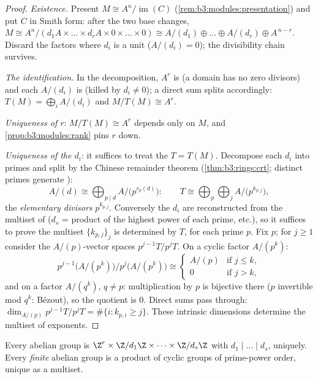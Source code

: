 \begin{proof}
\emph{Existence.} Present $M \cong A^n/\operatorname{im}(C)$
(\cref{rem:b3:modules:presentation}) and put $C$ in Smith form:
after the two base changes, $M \cong A^n / (d_1A \times \dots
\times d_rA \times 0 \times \dots \times 0) \cong A/(d_1) \oplus
\dots \oplus A/(d_r) \oplus A^{\,n - r}$. Discard the factors
where $d_i$ is a unit ($A/(d_i) = 0$); the divisibility chain
survives.

\emph{The  identification.} In the decomposition, $A^r$ is
 (a domain has no zero divisors) and each $A/(d_i)$
is  (killed by $d_i \ne 0$); a direct sum splits 
accordingly: $T(M) = \bigoplus_i A/(d_i)$ and $M/T(M) \cong A^r$.

\emph{Uniqueness of $r$}: $M/T(M) \cong A^r$ depends only on $M$,
and \cref{prop:b3:modules:rank} pins $r$ down.

\emph{Uniqueness of the $d_i$}: it suffices to treat the  $T = T(M)$. Decompose each $d_i$ into primes and split by
the Chinese remainder theorem (\cref{thm:b3:rings:crt}; distinct
primes generate ):
\[
A/(d) \cong \bigoplus_{p \mid d} A/\bigl(p^{v_p(d)}\bigr):
\qquad
T \cong \bigoplus_{p} \bigoplus_{j} A/\bigl(p^{k_{p,j}}\bigr),
\]
the \emph{elementary divisors}
$p^{k_{p,j}}$. Conversely the $d_i$ are reconstructed from the
multiset of  ($d_s$ = product of the highest
power of each prime, etc.), so it suffices to prove the
multiset $\{k_{p,j}\}_j$ is determined by $T$, for each prime
$p$. Fix $p$; for $j \geq 1$ consider the $A/(p)$-vector spaces
$p^{j-1}T/p^jT$. On a cyclic factor $A/(p^k)$:
\[
p^{j-1}\bigl(A/(p^k)\bigr)\big/p^{j}\bigl(A/(p^k)\bigr)
\cong
\begin{cases}
A/(p) & \text{if } j \leq k,\\
0 & \text{if } j > k,
\end{cases}
\]
and on a factor $A/(q^k)$, $q \neq p$: multiplication by $p$ is
bijective there ($p$ invertible mod $q^k$: B\'ezout), so the
quotient is $0$. Direct sums pass through: $\dim_{A/(p)}
p^{j-1}T/p^jT = \#\{i : k_{p,i} \geq j\}$. These intrinsic
dimensions determine the multiset of exponents.
\end{proof}

\begin{corollary}
\label{cor:b3:modules:abelian}
Every  abelian group is $\Z^r \times
\Z/d_1\Z\times\dots\times\Z/d_s\Z$ with $d_1 \mid \dots \mid
d_s$, uniquely. Every \emph{finite} abelian group is a product of
cyclic groups of prime-power order, unique as a
multiset.
\end{corollary}

